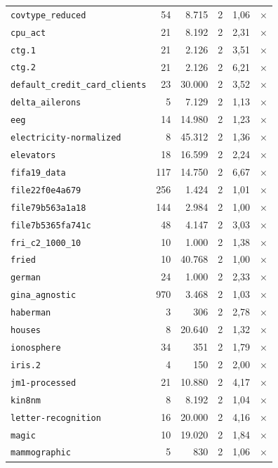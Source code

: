 \begin{longtable}{lrrrrc}
    \texttt{covtype\_reduced} & 54 & 8.715 & 2 & 1,06 & $\times$ \\
    \texttt{cpu\_act} & 21 & 8.192 & 2 & 2,31 & $\times$ \\
    \texttt{ctg.1} & 21 & 2.126 & 2 & 3,51 & $\times$ \\
    \texttt{ctg.2} & 21 & 2.126 & 2 & 6,21 & $\times$ \\
    \texttt{default\_credit\_card\_clients} & 23 & 30.000 & 2 & 3,52 & $\times$ \\
    \texttt{delta\_ailerons} & 5 & 7.129 & 2 & 1,13 & $\times$ \\
    \texttt{eeg} & 14 & 14.980 & 2 & 1,23 & $\times$ \\
    \texttt{electricity-normalized} & 8 & 45.312 & 2 & 1,36 & $\times$ \\
    \texttt{elevators} & 18 & 16.599 & 2 & 2,24 & $\times$ \\
    \texttt{fifa19\_data} & 117 & 14.750 & 2 & 6,67 & $\times$ \\
    \texttt{file22f0e4a679} & 256 & 1.424 & 2 & 1,01 & $\times$ \\
    \texttt{file79b563a1a18} & 144 & 2.984 & 2 & 1,00 & $\times$ \\
    \texttt{file7b5365fa741c} & 48 & 4.147 & 2 & 3,03 & $\times$ \\
    \texttt{fri\_c2\_1000\_10} & 10 & 1.000 & 2 & 1,38 & $\times$ \\
    \texttt{fried} & 10 & 40.768 & 2 & 1,00 & $\times$ \\
    \texttt{german} & 24 & 1.000 & 2 & 2,33 & $\times$ \\
    \texttt{gina\_agnostic} & 970 & 3.468 & 2 & 1,03 & $\times$ \\
    \texttt{haberman} & 3 & 306 & 2 & 2,78 & $\times$ \\
    \texttt{houses} & 8 & 20.640 & 2 & 1,32 & $\times$ \\
    \texttt{ionosphere} & 34 & 351 & 2 & 1,79 & $\times$ \\
    \texttt{iris.2} & 4 & 150 & 2 & 2,00 & $\times$ \\
    \texttt{jm1-processed} & 21 & 10.880 & 2 & 4,17 & $\times$ \\
    \texttt{kin8nm} & 8 & 8.192 & 2 & 1,04 & $\times$ \\
    \texttt{letter-recognition} & 16 & 20.000 & 2 & 4,16 & $\times$ \\
    \texttt{magic} & 10 & 19.020 & 2 & 1,84 & $\times$ \\
    \texttt{mammographic} & 5 & 830 & 2 & 1,06 & $\times$ \\

\end{longtable}

